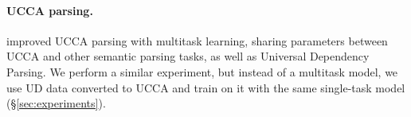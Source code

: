 \documentclass[11pt,a4paper]{article}
\begin{document}
\paragraph{UCCA parsing.}

 improved UCCA parsing with multitask learning, sharing parameters
between UCCA and other semantic parsing tasks, as well as Universal Dependency Parsing.
We perform a similar experiment, but instead of a multitask model,
we use UD data converted to UCCA and train on it with the same single-task model (\S\ref{sec:experiments}).
%
%




\end{document}
